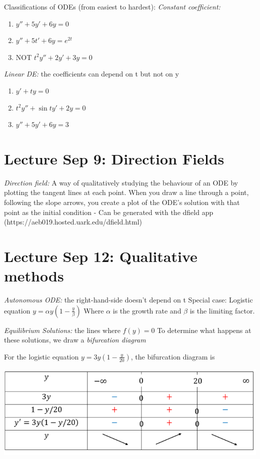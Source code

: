 \documentclass[12pt]{article}
\begin{document}
Classifications of ODEs (from easiest to hardest):
\emph{Constant coefficient:}
\begin{enumerate}
    \item $y'' + 5y' + 6y = 0$
    \item $y'' + 5t' + 6y = e^{2t}$
    \item NOT $t^2 y'' + 2y' + 3y = 0$
\end{enumerate}

\emph{Linear DE:} the coefficients can depend on t but not on y
\begin{enumerate}
    \item $y' + ty = 0$
    \item $t^2 y'' + \sin t y' + 2y = 0$
    \item $y'' + 5y' + 6y = 3$
\end{enumerate}

\section{Lecture Sep 9: Direction Fields}

\emph{Direction field:} A way of qualitatively studying the behaviour of an ODE by plotting the tangent lines at each point. When you draw a line through a point, following the slope arrows, you create a plot of the ODE's solution with that point as the initial condition
- Can be generated with the dfield app (https://aeb019.hosted.uark.edu/dfield.html)

\section{Lecture Sep 12: Qualitative methods}

\emph{Autonomous ODE:} the right-hand-side doesn't depend on t
Special case: Logistic equation $y = \alpha y (1 - \frac{y}{\beta})$
Where $\alpha$ is the growth rate and $\beta$ is the limiting factor. 

\emph{Equilibrium Solutions:} the lines where $f(y) = 0$
To determine what happens at these solutions, we draw a \emph{bifurcation diagram}

For the logistic equation $y= 3y (1 - \frac{y}{20})$, the bifurcation diagram is 

\includegraphics{Images/bifurcation.png}
\end{document}
